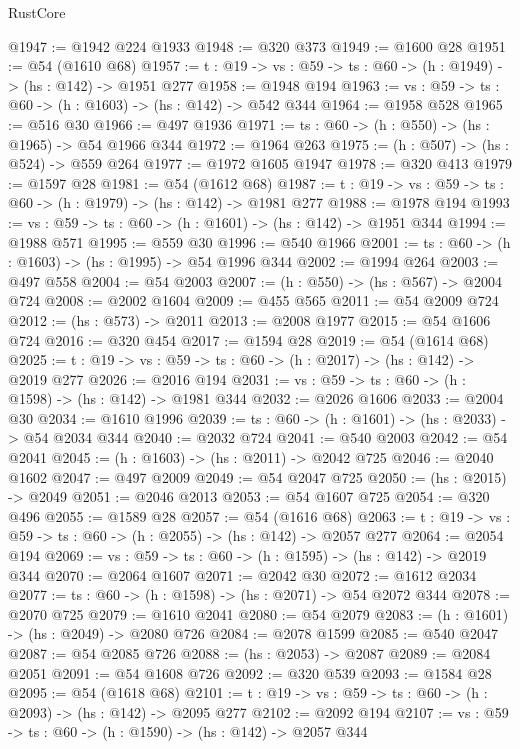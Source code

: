 \begin{lexlean}{RustCore}
\begin{coremodule}
@1947 := @1942 @224 @1933
@1948 := @320 @373
@1949 := @1600 @28
@1951 := @54 (@1610 @68)
@1957 := {t : @19} -> {vs : @59} -> {ts : @60} -> (h : @1949) -> (hs : @142) -> @1951 @277
@1958 := @1948 @194
@1963 := {vs : @59} -> {ts : @60} -> (h : @1603) -> (hs : @142) -> @542 @344
@1964 := @1958 @528
@1965 := @516 @30
@1966 := @497 @1936
@1971 := {ts : @60} -> (h : @550) -> (hs : @1965) -> @54 @1966 @344
@1972 := @1964 @263
@1975 := (h : @507) -> (hs : @524) -> @559 @264
@1977 := @1972 @1605 @1947
@1978 := @320 @413
@1979 := @1597 @28
@1981 := @54 (@1612 @68)
@1987 := {t : @19} -> {vs : @59} -> {ts : @60} -> (h : @1979) -> (hs : @142) -> @1981 @277
@1988 := @1978 @194
@1993 := {vs : @59} -> {ts : @60} -> (h : @1601) -> (hs : @142) -> @1951 @344
@1994 := @1988 @571
@1995 := @559 @30
@1996 := @540 @1966
@2001 := {ts : @60} -> (h : @1603) -> (hs : @1995) -> @54 @1996 @344
@2002 := @1994 @264
@2003 := @497 @558
@2004 := @54 @2003
@2007 := (h : @550) -> (hs : @567) -> @2004 @724
@2008 := @2002 @1604
@2009 := @455 @565
@2011 := @54 @2009 @724
@2012 := (hs : @573) -> @2011
@2013 := @2008 @1977
@2015 := @54 @1606 @724
@2016 := @320 @454
@2017 := @1594 @28
@2019 := @54 (@1614 @68)
@2025 := {t : @19} -> {vs : @59} -> {ts : @60} -> (h : @2017) -> (hs : @142) -> @2019 @277
@2026 := @2016 @194
@2031 := {vs : @59} -> {ts : @60} -> (h : @1598) -> (hs : @142) -> @1981 @344
@2032 := @2026 @1606
@2033 := @2004 @30
@2034 := @1610 @1996
@2039 := {ts : @60} -> (h : @1601) -> (hs : @2033) -> @54 @2034 @344
@2040 := @2032 @724
@2041 := @540 @2003
@2042 := @54 @2041
@2045 := (h : @1603) -> (hs : @2011) -> @2042 @725
@2046 := @2040 @1602
@2047 := @497 @2009
@2049 := @54 @2047 @725
@2050 := (hs : @2015) -> @2049
@2051 := @2046 @2013
@2053 := @54 @1607 @725
@2054 := @320 @496
@2055 := @1589 @28
@2057 := @54 (@1616 @68)
@2063 := {t : @19} -> {vs : @59} -> {ts : @60} -> (h : @2055) -> (hs : @142) -> @2057 @277
@2064 := @2054 @194
@2069 := {vs : @59} -> {ts : @60} -> (h : @1595) -> (hs : @142) -> @2019 @344
@2070 := @2064 @1607
@2071 := @2042 @30
@2072 := @1612 @2034
@2077 := {ts : @60} -> (h : @1598) -> (hs : @2071) -> @54 @2072 @344
@2078 := @2070 @725
@2079 := @1610 @2041
@2080 := @54 @2079
@2083 := (h : @1601) -> (hs : @2049) -> @2080 @726
@2084 := @2078 @1599
@2085 := @540 @2047
@2087 := @54 @2085 @726
@2088 := (hs : @2053) -> @2087
@2089 := @2084 @2051
@2091 := @54 @1608 @726
@2092 := @320 @539
@2093 := @1584 @28
@2095 := @54 (@1618 @68)
@2101 := {t : @19} -> {vs : @59} -> {ts : @60} -> (h : @2093) -> (hs : @142) -> @2095 @277
@2102 := @2092 @194
@2107 := {vs : @59} -> {ts : @60} -> (h : @1590) -> (hs : @142) -> @2057 @344

\end{coremodule}
\end{lexlean}
